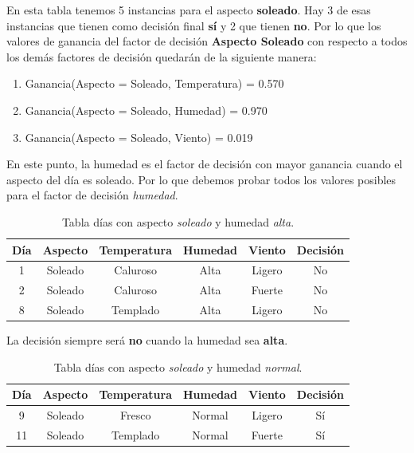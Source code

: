 \begin{UClist}
	En esta tabla tenemos 5 instancias para el aspecto \textbf{soleado}. Hay 3 de esas instancias que tienen como decisión final \textbf{sí} y 2 que tienen \textbf{no}. Por lo que los valores de ganancia del factor de decisión \textbf{Aspecto Soleado} con respecto a todos los demás factores de decisión quedarán de la siguiente manera:\\

	\begin{enumerate}
		\item Ganancia(Aspecto = Soleado, Temperatura) = 0.570
		\item Ganancia(Aspecto = Soleado, Humedad) = 0.970
		\item Ganancia(Aspecto = Soleado, Viento) = 0.019
	\end{enumerate}

	En este punto, la humedad es el factor de decisión con mayor ganancia cuando el aspecto del día es soleado. Por lo que debemos probar todos los valores posibles para el factor de decisión \emph{humedad}.\\

	\begin{table}[H]
		\begin{center}
			\label{tab:tablaInduccionAspectoSoleadoHumedadAlta}
			\begin{tabular}{c|c|c|c|c|c}
				\textbf{Día} & \textbf{Aspecto} & \textbf{Temperatura} & \textbf{Humedad} & \textbf{Viento} & \textbf{Decisión}\\
				\hline
				1 & Soleado & Caluroso & Alta & Ligero & No\\
				2 & Soleado & Caluroso & Alta & Fuerte & No\\
				8 & Soleado & Templado & Alta & Ligero & No\\
			\end{tabular}
		\end{center}
		\caption{Tabla días con aspecto \emph{soleado} y humedad \emph{alta}.}
	\end{table}

	La decisión siempre será \textbf{no} cuando la humedad sea \textbf{alta}.\\

	\begin{table}[H]
		\begin{center}
			\label{tab:tablaInduccionAspectoSoleadoHumedadNormal}
			\begin{tabular}{c|c|c|c|c|c}
				\textbf{Día} & \textbf{Aspecto} & \textbf{Temperatura} & \textbf{Humedad} & \textbf{Viento} & \textbf{Decisión}\\
				\hline
				9 & Soleado & Fresco & Normal & Ligero & Sí\\
				11 & Soleado & Templado & Normal & Fuerte & Sí\\
			\end{tabular}
		\end{center}
		\caption{Tabla días con aspecto \emph{soleado} y humedad \emph{normal}.}
	\end{table}


\end{UClist}
